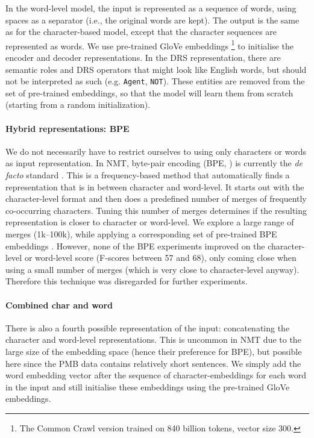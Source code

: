 \documentclass[11pt,a4paper]{article}
\begin{document}
In the word-level model, the input is represented as a sequence of words, using spaces as a separator (i.e., the original words are kept). The output is the same as for the character-based model, except that the character sequences are represented as words.
We use pre-trained GloVe embeddings \cite{glove:14}\footnote{The Common Crawl version trained on 840 billion tokens, vector size 300.} 
to initialise the encoder and decoder representations. In the DRS representation, there are semantic roles and DRS operators that might look like English words, but should not be interpreted as such (e.g. \texttt{Agent}, \texttt{NOT}). These entities are removed from the set of pre-trained embeddings, so that the model will learn them from scratch (starting from a random initialization). 

\paragraph{Hybrid representations: BPE}

We do not necessarily have to restrict ourselves to using only characters or words as input representation. In NMT, byte-pair encoding (BPE, \citealt{sennrich-haddow-birch:2016:P16-12}) is currently the \emph{de facto} standard \cite{bojar-EtAl:2017:WMT1}. 
This is a frequency-based method that automatically finds a representation that is in between character and word-level. 
It starts out with the character-level format and then does a predefined number of merges of frequently co-occurring characters. Tuning this number of merges determines if the resulting representation is closer to character or word-level. We explore a large range of merges (1k--100k), while applying a corresponding set of pre-trained BPE embeddings \cite{bpe_pretrain:18}. However, none of the BPE experiments improved on the character-level or word-level score (F-scores between 57 and 68), only coming close when using a small number of merges (which is very close to character-level anyway). Therefore this technique was disregarded for further experiments.			
			
\paragraph{Combined char and word}			
			
There is also a fourth possible representation of the input: concatenating the character and word-level representations. This is uncommon in NMT due to the large size of the embedding space (hence their preference for BPE), but possible here since the PMB data contains relatively short sentences. We simply add the word embedding vector after the sequence of character-embeddings for each word in the input and still initialise these embeddings using the pre-trained GloVe embeddings. 
\end{document}
